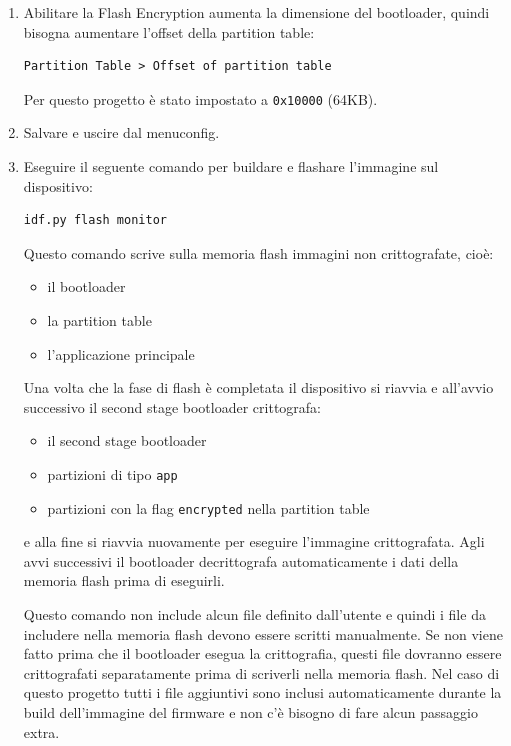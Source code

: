 \documentclass[a4paper]{article}
\begin{document}
\begin{enumerate}
  \item Abilitare la Flash Encryption aumenta la dimensione del bootloader, quindi bisogna
    aumentare l'offset della partition table:
\begin{lstlisting}
Partition Table > Offset of partition table
\end{lstlisting}
    Per questo progetto è stato impostato a \texttt{0x10000} (64KB).

  \item Salvare e uscire dal menuconfig.

  \item Eseguire il seguente comando per buildare e flashare l'immagine sul dispositivo:
\begin{lstlisting}
idf.py flash monitor
\end{lstlisting}
    Questo comando scrive sulla memoria flash immagini non crittografate, cioè:
    \begin{itemize}
      \item il bootloader
      \item la partition table
      \item l'applicazione principale
    \end{itemize}
    Una volta che la fase di flash è completata il dispositivo si riavvia e all'avvio
    successivo il second stage bootloader crittografa:
    \begin{itemize}
      \item il second stage bootloader
      \item partizioni di tipo \texttt{app}
      \item partizioni con la flag \texttt{encrypted} nella partition table
    \end{itemize}
    e alla fine si riavvia nuovamente per eseguire l'immagine crittografata.
    Agli avvi successivi il bootloader decrittografa automaticamente i dati
    della memoria flash prima di eseguirli.

    \vspace{1em}
    \noindent
    Questo comando non include alcun file definito dall'utente e quindi i file da
    includere nella memoria flash devono essere scritti manualmente. Se non viene
    fatto prima che il bootloader esegua la crittografia, questi file dovranno essere
    crittografati separatamente prima di scriverli nella memoria flash. Nel caso di questo
    progetto tutti i file aggiuntivi sono inclusi automaticamente durante la build
    dell'immagine del firmware e non c'è bisogno di fare alcun passaggio extra.
\end{enumerate}
\end{document}
